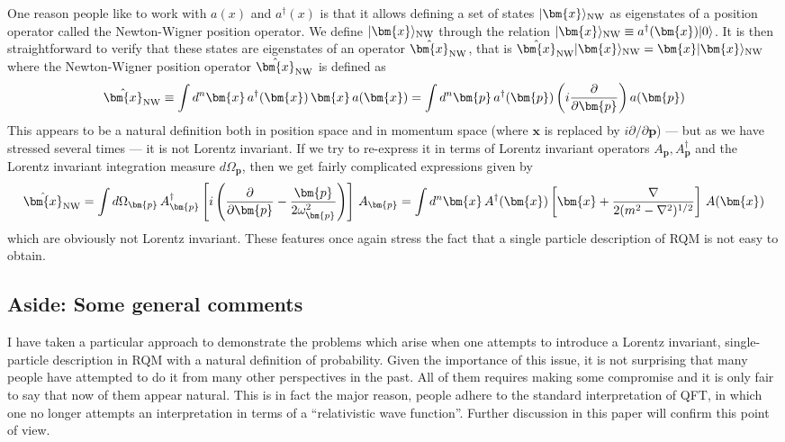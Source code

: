 \documentclass{article}
\def\ket#1{|#1\rangle}                    %
\begin{document}
 One reason people like to work with $a(x)$ and $a^\dagger(x)$ is that it allows defining a set of states $\ket{\bm{x}}_{\rm NW}$ as  eigenstates of a position operator called the Newton-Wigner position operator.  We define  $\ket{\bm{x}}_{\rm NW}$ through the relation 
 $
 \ket{\bm{x}}_{\rm NW} \equiv a^\dagger (\bm{x})\ket{0}
 $. It is then straightforward to verify that these states are eigenstates of an operator $\hat{\bm{x}}_{\rm NW}$, that is 
 $
 \hat{\bm{x}}_{\rm NW} \ket{\bm{x}}_{\rm NW} = \bm{x}\ket{\bm{x}}_{\rm NW}
 $
 where the Newton-Wigner position operator $\hat{\bm{x}}_{\rm NW}$ is defined as 
 \begin{equation}
 \hat{\bm{x}}_{\rm NW} \equiv \int d^n \bm{x}\, a^\dagger(\bm{x})\, \bm{x}\, a(\bm{x}) = \int d^n \bm{p}\, a^\dagger(\bm{p}) \left(i\frac{\partial}{\partial \bm{p}}\right) a(\bm{p})
 \end{equation} 
 This appears to be a natural definition both in position space and in momentum space (where $\bm{x}$ is replaced by $i\partial/\partial \bm{p}$) --- but as we have stressed several times --- it is not Lorentz invariant. If we try to re-express it in terms of Lorentz invariant operators $A_{\bm{p}}, A^\dagger_{\bm{p}}$ and the Lorentz invariant integration measure $d\Omega_{\bm{p}}$, then we get fairly complicated expressions given by
 \begin{equation}
 \hat{\bm{x}}_{\rm NW} = \int d\Omega_{\bm{p}} \, A^\dagger_{\bm{p}} \left[ i \left(\frac{\partial}{\partial \bm{p}} - \frac{\bm{p}}{2\omega_{\bm{p}}^2}\right)\right]\, A_{\bm{p}} = \int d^n \bm{x}\, A^\dagger(\bm{x}) \left[ \bm{x} + \frac{\nabla}{2(m^2 - \nabla^2)^{1/2}}\right] \, A(\bm{x})
 \end{equation} 
 which are obviously not Lorentz invariant. These features once again stress the fact that a single particle description of RQM is not easy to obtain. 

 \subsection{Aside: Some general comments}

I have taken a particular approach to demonstrate the problems which arise when one attempts to introduce a Lorentz invariant, single-particle description in RQM with a natural definition of probability. Given the importance of this issue, it is not surprising that many people have attempted to do it from many other perspectives in the past. All of them requires making some compromise and it is only fair to say that now of them appear natural. This is in fact the major reason, people adhere to the standard interpretation of QFT, in which one no longer attempts an interpretation in terms of a ``relativistic wave function''. Further discussion in this paper will confirm this point of view.
\end{document}
